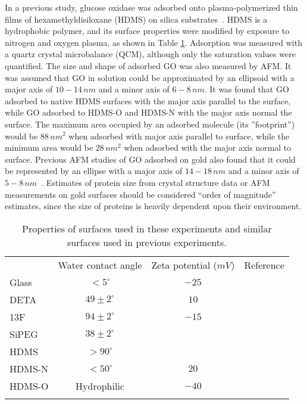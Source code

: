 In a previous study, glucose oxidase was adsorbed onto plasma-polymerized
thin films of hexamethyldisiloxane (HDMS) on silica substrates~\cite{Muguruma2006}.
HDMS is a hydrophobic polymer, and its surface properties were modified
by exposure to nitrogen and oxygen plasma, as shown in Table \ref{tab:Surface Properties}.
Adsorption was measured with a quartz crystal microbalance (QCM),
although only the saturation values were quantified. The size and
shape of adsorbed GO was also measured by AFM. It was assumed that
GO in solution could be approximated by an ellipsoid with a major
axis of $10-14\, nm$ and a minor axis of $6-8\, nm$. It was found
that GO adsorbed to native HDMS surfaces with the major axis parallel
to the surface, while GO adsorbed to HDMS-O and HDMS-N with the major
axis normal the surface. The maximum area occupied by an adsorbed
molecule (its ''footprint'') would be $88\, nm^{2}$ when adsorbed
with major axis parallel to surface, while the minimum area would
be $28\, nm^{2}$ when adsorbed with the major axis normal to surface.
Previous AFM studies of GO adsorbed on gold also found that it could
be represented by an ellipse with a major axis of $14-18\, nm$ and
a minor axis of $5-8\, nm$~\cite{Quinto1998}. Estimates of protein
size from crystal structure data or AFM measurements on gold surfaces
should be considered {}``order of magnitude'' estimates, since the
size of proteins is heavily dependent upon their environment. 

%
\begin{table}
\caption{\label{tab:Surface Properties}Properties of surfaces used in these
experiments and similar surfaces used in previous experiments.}
\begin{tabular}{lccc}
 & Water contact angle & Zeta potential ($mV$) & Reference\tabularnewline[\doublerulesep]
\cline{2-4} 
\noalign{\vskip\doublerulesep}
Glass & $<5^{\circ}$ & $-25$ & \cite{Kirby2004,Wilson2011a}\tabularnewline
\noalign{\vskip\doublerulesep}
DETA & $49\pm2^{\circ}$ & $10$ & \cite{Wilson2011a,Metwalli2006}\tabularnewline
\noalign{\vskip\doublerulesep}
13F & $94\pm2^{\circ}$ & $-15$ & \cite{Stenger1992,Tandon2008}\tabularnewline
\noalign{\vskip\doublerulesep}
SiPEG & $38\pm2^{\circ}$ &  & \cite{Wilson2011a}\tabularnewline
\noalign{\vskip\doublerulesep}
HDMS & $>90^{\circ}$ &  & \cite{Muguruma2006}\tabularnewline
\noalign{\vskip\doublerulesep}
HDMS-N & $<50^{\circ}$ & $20$ & \cite{Muguruma2006}\tabularnewline
\noalign{\vskip\doublerulesep}
HDMS-O & Hydrophilic & $-40$ & \cite{Muguruma2006}\tabularnewline
\noalign{\vskip\doublerulesep}
\end{tabular}%
\end{table}



